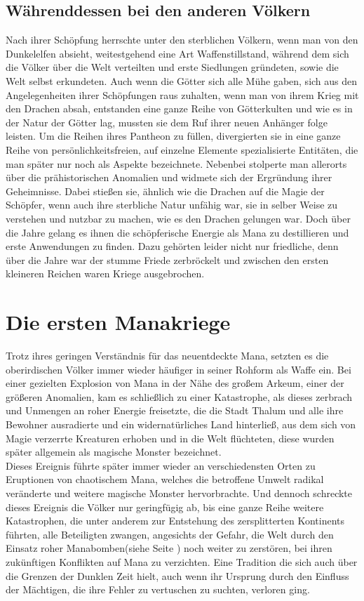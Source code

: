 \documentclass[a4paper,12pt,oneside]{book}
\begin{document}
\subsection{Währenddessen bei den anderen Völkern}
Nach ihrer Schöpfung herrschte unter den sterblichen Völkern, wenn man von den Dunkelelfen absieht, weitestgehend eine Art Waffenstillstand, während dem sich die Völker über die Welt verteilten und erste Siedlungen gründeten, sowie die Welt selbst erkundeten. Auch wenn die Götter sich alle Mühe gaben, sich aus den Angelegenheiten ihrer Schöpfungen raus zuhalten, wenn man von ihrem Krieg mit den Drachen absah, entstanden eine ganze Reihe von Götterkulten und wie es in der Natur der Götter lag, mussten sie dem Ruf ihrer neuen Anhänger folge leisten. Um die Reihen ihres Pantheon zu füllen, divergierten sie in eine ganze Reihe von persönlichkeitsfreien, auf einzelne Elemente spezialisierte Entitäten, die man später nur noch als Aspekte bezeichnete. 
Nebenbei stolperte man allerorts über die prähistorischen Anomalien und widmete sich der Ergründung ihrer Geheimnisse. Dabei stießen sie, ähnlich wie die Drachen auf die Magie der Schöpfer, wenn auch ihre sterbliche Natur unfähig war, sie in selber Weise zu verstehen und nutzbar zu machen, wie es den Drachen gelungen war. Doch über die Jahre gelang es ihnen die schöpferische Energie als Mana zu destillieren und erste Anwendungen zu finden. Dazu gehörten leider nicht nur friedliche, denn über die Jahre war der stumme Friede zerbröckelt und zwischen den ersten kleineren Reichen waren Kriege ausgebrochen. 

\section{Die ersten Manakriege}
Trotz ihres geringen Verständnis für das neuentdeckte Mana, setzten es die oberirdischen Völker immer wieder häufiger in seiner Rohform als Waffe ein. Bei einer gezielten Explosion von Mana in der Nähe des großem Arkeum, einer der größeren Anomalien, kam es schließlich zu einer Katastrophe, als dieses zerbrach und Unmengen an roher Energie freisetzte, die die Stadt Thalum und alle ihre Bewohner ausradierte und ein widernatürliches Land hinterließ, aus dem sich von Magie verzerrte Kreaturen erhoben und in die Welt flüchteten, diese wurden später allgemein als magische Monster bezeichnet. \\Dieses Ereignis führte später immer wieder an verschiedensten Orten zu Eruptionen von chaotischem Mana, welches die betroffene Umwelt radikal veränderte und weitere magische Monster hervorbrachte. Und dennoch schreckte dieses Ereignis die Völker nur geringfügig ab, bis eine ganze Reihe weitere Katastrophen, die unter anderem zur Entstehung des zersplitterten Kontinents führten,  alle Beteiligten zwangen, angesichts der Gefahr, die Welt durch den Einsatz roher Manabomben(siehe Seite \pageref{Manabombe}) noch weiter zu zerstören, bei ihren zukünftigen Konflikten auf Mana zu verzichten. Eine Tradition die sich auch über die Grenzen der Dunklen Zeit hielt, auch wenn ihr Ursprung durch den Einfluss der Mächtigen, die ihre Fehler zu vertuschen zu suchten, verloren ging.
\end{document}
